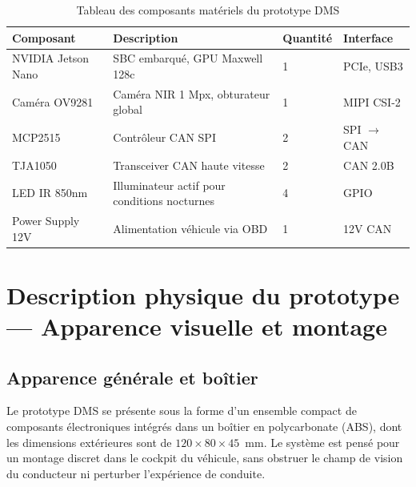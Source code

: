 \documentclass[12pt,a4paper]{report}
\begin{document}
\begin{table}[H]
\centering
\caption{Tableau des composants mat\'eriels du prototype DMS}
\label{tab:hardware}
\begin{tabular}{L{3.5cm} L{4.5cm} C{2cm} L{2.5cm}}
\toprule
\textbf{Composant} & \textbf{Description} & \textbf{Quantit\'e} & \textbf{Interface} \\
\midrule
NVIDIA Jetson Nano & SBC embarqu\'e, GPU Maxwell 128c & 1 & PCIe, USB3 \\
Cam\'era OV9281 & Cam\'era NIR 1 Mpx, obturateur global & 1 & MIPI CSI-2 \\
MCP2515 & Contr\^oleur CAN SPI & 2 & SPI $\to$ CAN \\
TJA1050 & Transceiver CAN haute vitesse & 2 & CAN 2.0B \\
LED IR 850nm & Illuminateur actif pour conditions nocturnes & 4 & GPIO \\
Power Supply 12V & Alimentation v\'ehicule via OBD & 1 & 12V CAN \\
\bottomrule
\end{tabular}
\end{table}

\section{Description physique du prototype --- Apparence visuelle et montage}
\label{sec:prototype_physique}

\subsection{Apparence g\'en\'erale et boîtier}

Le prototype DMS se pr\'esente sous la forme d'un ensemble compact de composants \'electroniques int\'egr\'es dans un boîtier en polycarbonate (ABS), dont les dimensions ext\'erieures sont de $120 \times 80 \times 45$~mm. Le syst\`eme est pens\'e pour un montage discret dans le cockpit du v\'ehicule, sans obstruer le champ de vision du conducteur ni perturber l'exp\'erience de conduite.
\end{document}
